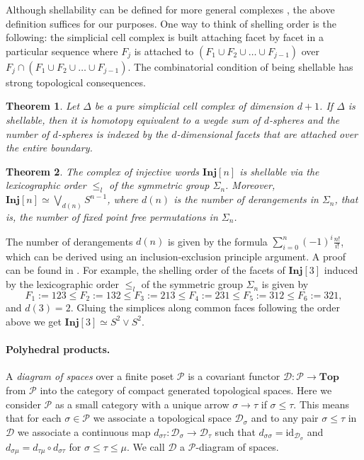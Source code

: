 \documentclass[a4paper,11pt]{article}
\newtheorem{theorem}{Theorem}[section]
\theoremstyle{definition}
\newcommand{\inj}{\mathbf{Inj}}
\newcommand{\id}{\text{id}}
\newcommand{\Top}{\textbf{Top}}
\newcommand{\DD}{\mathcal{D}}
\newcommand{\PP}{\mathcal{P}}
\begin{document}
Although shellability can be defined for more general complexes \cite{bj-wa-non-pure-shell}, the above definition suffices for our purposes. One way to think of shelling order is the following: the simplicial cell complex is built attaching facet by facet in a particular sequence where $F_j$ is attached to $(F_1 \cup F_2 \cup \ldots \cup F_{j-1})$ over $F_j \cap (F_1 \cup F_2 \cup \ldots \cup F_{j-1})$. The combinatorial condition of being shellable has strong topological consequences. 
 
\begin{theorem}\cite[Proposition~4.3]{bj-shell} %
  Let $\Delta$ be a pure simplicial cell complex of dimension $d+1$. If $\Delta$ is shellable, then it is homotopy equivalent to a wegde sum of $d$-spheres and the number of $d$-spheres is indexed by the $d$-dimensional facets that are attached over the entire boundary.
\end{theorem}
\begin{theorem}\cite[Theorem~6.1]{lex-wachs-bjoern}\label{theo-shell-inj}
 The complex of injective words $\inj[n]$ is shellable via the lexicographic order $\leq_l$ of the symmetric group $\Sigma_n$. Moreover, $\inj[n] \simeq \bigvee_{d(n)} S^{n-1}$, where $d(n)$ is the number of derangements in $\Sigma_n$, that is, the number of fixed point free permutations in $\Sigma_n$. 
\end{theorem}

The number of derangements $d(n)$ is given by the formula $\sum_{i=0}^n(-1)^i\frac{n!}{i!}$, which can be derived using an inclusion-exclusion principle argument. A proof can be found in \cite[Example~2.2.1]{enumerative-book-stanley}. For example, the shelling order of the facets of $\inj[3]$ induced by the lexicographic order $\leq_l$ of the symmetric group $\Sigma_n$ is given by  
\[
	F_1 := 123 \leq F_2 := 132 \leq F_3 := 213 \leq F_4 := 231 \leq F_5 := 312 \leq F_6 := 321,
\]
and $d(3) =2 $. Gluing the simplices along common faces following the order above we get  $\inj[3] \simeq S^2 \vee S^2$. 

\paragraph{Polyhedral products.}
A \emph{diagram of spaces} over a finite poset $\PP$ is a covariant functor $\DD: \PP \to \Top$ from $\PP$ into the category of compact generated topological spaces. Here we consider $\PP$ as a small category with a unique arrow $\sigma \to \tau$ if $\sigma \leq \tau$. This means that for each $\sigma \in \PP$ we associate a topological space $\DD_\sigma$ and to any pair $\sigma \leq \tau$ in $\DD$ we associate a continuous map $d_{\sigma\tau}: \DD_\sigma \to \DD_\tau$ such that $d_{\sigma\sigma} = \id_{\DD_\sigma}$ and $d_{\sigma\mu} = d_{\tau\mu}\circ d_{\sigma\tau}$ for $\sigma\leq\tau\leq\mu$. We call $\DD$ a $\PP$-diagram of spaces.
\end{document}
